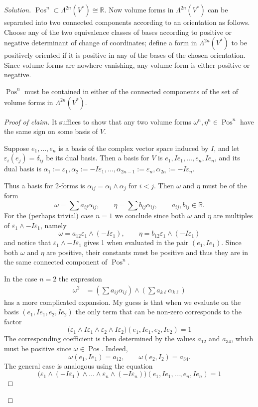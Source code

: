 \begin{proof}[Solution]\leavevmode

	$\operatorname{Pos}^n\subset\Lambda^{2n}(V^*)\cong \mathbb{R}$. Now volume forms in $\Lambda^{2n}(V^*)$ can be separated into two connected components according to an orientation as follows. Choose any of the two equivalence classes of bases according to positive or negative determinant of change of coordinates; define a form in $\Lambda^{2n}(V^*)$ to be positively oriented if it is positive in any of the bases of the chosen orientation. Since volume forms are nowhere-vanishing, any volume form is either positive or negative.

	\begin{claim}\leavevmode
	$\operatorname{Pos}^n$ must be contained in either of the connected components of the set of volume forms in $\Lambda^{2n}(V^*)$.		
	\end{claim}

	\begin{proof}[Proof of claim]\leavevmode
		It suffices to show that any two volume forms $\omega^n,\eta^n \in\operatorname{Pos}^n$ have the same sign on some basis of $V$.

		Suppose $e_1,\ldots,e_n$ is a basis of the complex vector space induced by $I$, and let $\varepsilon_i(e_j)=\delta_{ij}$ be its dual basis. Then a basis for $V$ is $e_1,Ie_1,\ldots,e_n,Ie_n$, and its dual basis is $\alpha_1:=\varepsilon_1,\alpha_2:=-I\varepsilon_1,\ldots,\alpha_{2n-1}:=\varepsilon_n,\alpha_{2n}:=-I \varepsilon_n$.

		Thus a basis for 2-forms is $\alpha_{ij}=\alpha_i\wedge \alpha_j$ for $i<j$. Then $\omega$ and $\eta$ must be of the form
	\[\omega=\sum a_{ij}\alpha_{ij},\qquad \eta=\sum b_{ij}\alpha_{ij},\qquad a_{ij},b_{ij} \in\mathbb{R}.\]
For the (perhaps trivial) case $n=1$ we conclude since both  $\omega$ and $\eta$ are multiples of $\varepsilon_1\wedge -I\varepsilon_1$, namely 
\[\omega=a_{12}\varepsilon_1\wedge (-I\varepsilon_1),\qquad \eta=b_{12}\varepsilon_1\wedge (-I\varepsilon_1)\]
and notice that $\varepsilon_1\wedge -I\varepsilon_1$ gives 1 when evaluated in the pair  $(e_1,Ie_1)$. Since both $\omega$ and $\eta$ are positive, their constants must be positive and thus they are in the same connected component of $\operatorname{Pos}^n$.

In the case $n=2$ the expression
	\begin{align*}\omega^2&=\left( \sum a_{ij}\alpha_{ij} \right)\wedge \left( \sum a_{k\ell}\alpha_{k\ell} \right)
	\end{align*}
	has a more complicated expansion. My guess is that when we evaluate on the basis $(e_1,Ie_1,e_2,Ie_2)$ the only term that can be non-zero corresponds to the factor
	\[\Big(\varepsilon_1\wedge I\varepsilon_1\wedge \varepsilon_2\wedge I\varepsilon_2\Big)(e_1,Ie_1,e_2,Ie_2)=1\]
The corresponding coefficient is then determined by the values $a_{12}$ and $a_{34}$, which must be positive since $\omega\in\operatorname{Pos}$. Indeed,
\[\omega(e_1,Ie_1)=a_{12},\qquad \omega(e_2,I_2)=a_{34}.\]
The general case is analogous using the equation
	\[\Big(\varepsilon_1\wedge (-I\varepsilon_1)\wedge \ldots \wedge \varepsilon_n\wedge (-I\varepsilon_n)\Big)(e_1,Ie_1,\ldots,e_n,Ie_n)=1\]


\end{proof}
\end{proof}
